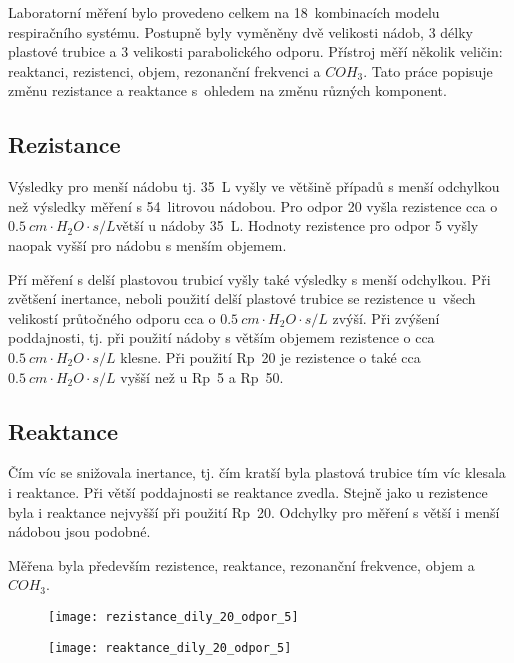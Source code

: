 Laboratorní měření bylo provedeno celkem na 18~kombinacích modelu respiračního systému. Postupně byly vyměněny dvě velikosti nádob, 3 délky plastové trubice a 3 velikosti parabolického odporu. Přístroj měří několik veličin: reaktanci, rezistenci, objem, rezonanční frekvenci a $COH_{3}$. Tato práce popisuje změnu rezistance a reaktance s~ohledem na změnu různých komponent.  

 
\subsection{Rezistance}

Výsledky pro menší nádobu tj. \SI{35}{L} vyšly ve většině případů s menší odchylkou než výsledky měření s 54~litrovou nádobou. Pro odpor 20 vyšla rezistence cca o $\SI{0,5}{cm\cdot H_{2}O \cdot s/L} $větší u nádoby \SI{35}{L}. Hodnoty rezistence pro odpor 5 vyšly naopak vyšší pro nádobu s menším objemem. 

Pří měření s delší plastovou trubicí vyšly také výsledky s menší odchylkou. 
Při zvětšení inertance, neboli použití delší plastové trubice se rezistence u~všech velikostí průtočného odporu cca o  $\SI{0,5}{ cm\cdot H_{2}O \cdot s/L} $ zvýší. 
Při zvýšení poddajnosti, tj. při použití nádoby s  větším objemem rezistence o cca  $\SI{0,5}{ cm\cdot H_{2}O \cdot s/L} $  klesne. 
Při použití Rp~20 je rezistence o také cca  $\SI{0,5}{ cm\cdot H_{2}O \cdot s/L} $  vyšší než u Rp~5 a Rp~50. 

\subsection{Reaktance}

Čím víc se snižovala inertance, tj. čím kratší byla plastová trubice tím víc klesala i reaktance. Při větší poddajnosti se reaktance zvedla. Stejně jako u rezistence byla i reaktance nejvyšší při použití Rp~20. Odchylky pro měření s větší i menší nádobou jsou podobné. 


Měřena byla především rezistence, reaktance, rezonanční frekvence, objem a $COH_{3}$. 



\begin{figure}
\centering
\begin{minipage}{.5\textwidth}
  \centering
  \texttt{[image: rezistance\_dily\_20\_odpor\_5]}
\captionsetup{justification=centering}
\end{minipage}%
\begin{minipage}{.5\textwidth}
  \centering
  \texttt{[image: reaktance\_dily\_20\_odpor\_5]}
\captionsetup{justification=centering}
\end{minipage}
\end{figure}


